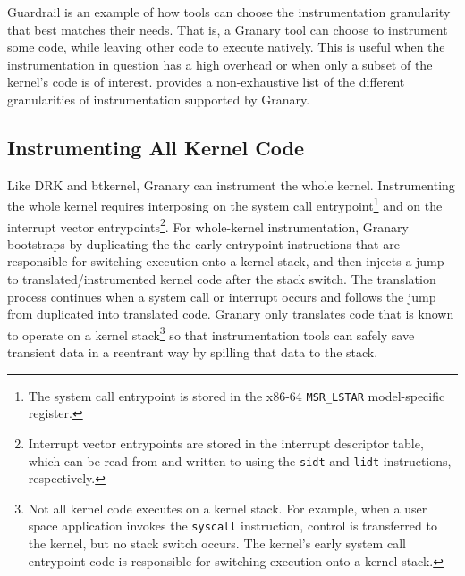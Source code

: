 \documentclass[preprint]{sigplanconf}
\begin{document}




Guardrail is an example of how tools can choose the instrumentation granularity that best matches their needs. That is, a Granary tool can choose to instrument some code, while leaving other code to execute natively. This is useful when the instrumentation in question has a high overhead or when only a subset of the kernel's code is of interest.  provides a non-exhaustive list of the different granularities of instrumentation supported by Granary.


\subsection{Instrumenting All Kernel Code}

Like DRK and btkernel, Granary can instrument the whole kernel. Instrumenting the whole kernel requires interposing on the system call entrypoint\footnote{The system call entrypoint is stored in the x86-64 \texttt{MSR\_LSTAR} model-specific register.} and on the interrupt vector entrypoints\footnote{Interrupt vector entrypoints are stored in the interrupt descriptor table, which can be read from and written to using the \texttt{sidt} and \texttt{lidt} instructions, respectively.}. For whole-kernel instrumentation, Granary bootstraps by duplicating the the early entrypoint instructions that are responsible for switching execution onto a kernel stack, and then injects a jump to translated/instrumented kernel code after the stack switch. The translation process continues when a system call or interrupt occurs and follows the jump from duplicated into translated code. Granary only translates code that is known to operate on a kernel stack\footnote{Not all kernel code executes on a kernel stack. For example, when a user space application invokes the \texttt{syscall} instruction, control is transferred to the kernel, but no stack switch occurs. The kernel's early system call entrypoint code is responsible for switching execution onto a kernel stack.} so that instrumentation tools can safely save transient data in a reentrant way by spilling that data to the stack.
\end{document}
